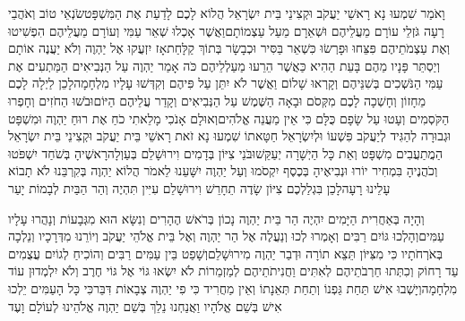 \documentclass[../main/main.tex]{subfiles}
\begin{document}
\begin{multicols}{\ncols}
וָאֹמַר שִׁמְעוּ נָא רָאשֵׁי יַעֲקֹב וּקְצִינֵי בֵּית יִשְׂרָאֵל הֲלוֹא לָכֶם לָדַעַת אֶת הַמִּשְׁפָּט\PreVerseSpace{}שֹׂנְאֵי טוֹב וְאֹהֲבֵי רָעָה גֹּזְלֵי עוֹרָם מֵעֲלֵיהֶם וּשְׁאֵרָם מֵעַל עַצְמוֹתָם\PreVerseSpace{}וַאֲשֶׁר אָכְלוּ שְׁאֵר עַמִּי וְעוֹרָם מֵעֲלֵיהֶם הִפְשִׁיטוּ וְאֶת עַצְמֹתֵיהֶם פִּצֵּחוּ וּפָרְשׂוּ כִּשְׁאֵר\SubEnd{} בַּסִּיר וּכְבָשָׂר בְּתוֹךְ קַלָּחַת\PreVerseSpace{}אָז יִזְעֲקוּ אֶל יַהְוֶה וְלֹא יַעֲנֶה אוֹתָם וְיַסְתֵּר פָּנָיו מֵהֶם בָּעֵת הַהִיא כַּאֲשֶׁר הֵרֵעוּ מַעַלְלֵיהֶם כֹּה אָמַר יַהְוֶה עַל הַנְּבִיאִים הַמַּתְעִים אֶת עַמִּי הַנֹּשְׁכִים בְּשִׁנֵּיהֶם וְקָרְאוּ שָׁלוֹם וַאֲשֶׁר לֹא יִתֵּן עַל פִּיהֶם וְקִדְּשׁוּ עָלָיו מִלְחָמָה\PreVerseSpace{}לָכֵן לַיְלָה לָכֶם מֵחָזוֹן וְחָשְׁכָה לָכֶם מִקְּסֹם וּבָאָה הַשֶּׁמֶשׁ עַל הַנְּבִיאִים וְקָדַר עֲלֵיהֶם הַיּוֹם\PreVerseSpace{}וּבֹשׁוּ הַחֹזִים וְחָפְרוּ הַקֹּסְמִים וְעָטוּ עַל שָׂפָם כֻּלָּם כִּי אֵין מַעֲנֵה אֱלֹהִים\PreVerseSpace{}וְאוּלָם אָנֹכִי מָלֵאתִי כֹחַ אֶת רוּחַ יַהְוֶה וּמִשְׁפָּט וּגְבוּרָה לְהַגִּיד לְיַעֲקֹב פִּשְׁעוֹ וּלְיִשְׂרָאֵל חַטָּאתוֹ \ClosedSection{}שִׁמְעוּ נָא זֹאת רָאשֵׁי בֵּית יַעֲקֹב וּקְצִינֵי בֵּית יִשְׂרָאֵל הַמֲתַעֲבִים מִשְׁפָּט וְאֵת כָּל הַיְשָׁרָה יְעַקֵּשׁוּ\PreVerseSpace{}בֹּנֵי\SubEnd{} צִיּוֹן בְּדָמִים וִירוּשָׁלֵם בְּעַוְלָה\PreVerseSpace{}רָאשֶׁיהָ בְּשֹׁחַד יִשְׁפֹּטוּ וְכֹהֲנֶיהָ בִּמְחִיר יוֹרוּ וּנְבִיאֶיהָ בְּכֶסֶף יִקְסֹמוּ וְעַל יַהְוֶה יִשָּׁעֵנוּ לֵאמֹר הֲלוֹא יַהְוֶה בְּקִרְבֵּנוּ לֹא תָבוֹא עָלֵינוּ רָעָה\PreVerseSpace{}לָכֵן בִּגְלַלְכֶם צִיּוֹן שָׂדֶה תֵחָרֵשׁ וִירוּשָׁלֵם עִיִּין תִּהְיֶה וְהַר הַבַּיִת לְבָמוֹת יָעַר\OpenSection{}\par
\pagebreak %
וְהָיָה בְּאַחֲרִית הַיָּמִים יִהְיֶה הַר בֵּית יַהְוֶה נָכוֹן בְּרֹאשׁ הֶהָרִים וְנִשָּׂא הוּא מִגְּבָעוֹת וְנָהֲרוּ עָלָיו עַמִּים\PreVerseSpace{}וְהָלְכוּ גּוֹיִם רַבִּים וְאָמְרוּ לְכוּ וְנַעֲלֶה אֶל הַר יַהְוֶה וְאֶל בֵּית אֱלֹהֵי יַעֲקֹב וְיוֹרֵנוּ מִדְּרָכָיו וְנֵלְכָה בְּאֹרְחֹתָיו כִּי מִצִּיּוֹן תֵּצֵא תוֹרָה וּדְבַר יַהְוֶה מִירוּשָׁלֵם\PreVerseSpace{}וְשָׁפַט בֵּין עַמִּים רַבִּים וְהוֹכִיחַ לְגוֹיִם עֲצֻמִים עַד רָחוֹק וְכִתְּתוּ חַרְבֹתֵיהֶם לְאִתִּים וַחֲנִיתֹתֵיהֶם לְמַזְמֵרוֹת לֹא יִשְׂאוּ גּוֹי אֶל גּוֹי חֶרֶב וְלֹא יִלְמְדוּן עוֹד מִלְחָמָה\PreVerseSpace{}וְיָשְׁבוּ אִישׁ תַּחַת גַּפְנוֹ וְתַחַת תְּאֵנָתוֹ וְאֵין מַחֲרִיד כִּי פִי יַהְוֶה צְבָאוֹת דִּבֵּר\PreVerseSpace{}כִּי כָּל הָעַמִּים יֵלְכוּ אִישׁ בְּשֵׁם אֱלֹהָיו וַאֲנַחְנוּ נֵלֵךְ בְּשֵׁם יַהְוֶה אֱלֹהֵינוּ לְעוֹלָם וָעֶד\OpenSection{}\par

\end{multicols}
\end{document}
